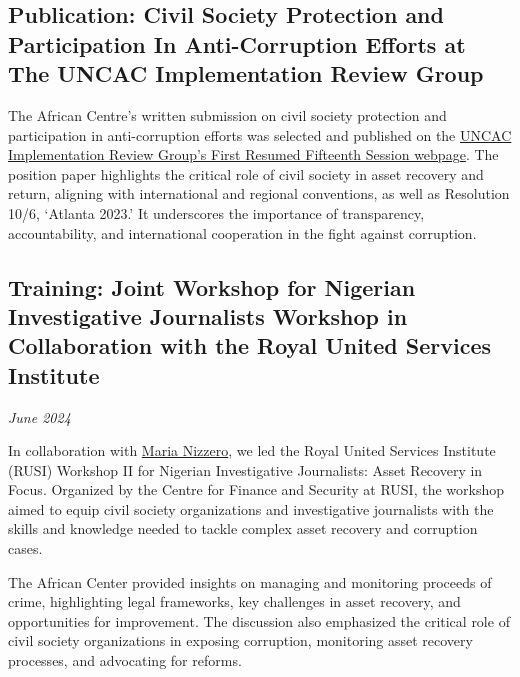 \documentclass[
  letterpaper,
  DIV=11,
  numbers=noendperiod]{scrreprt}
\begin{document}
\subsection{Publication: Civil Society Protection and Participation In
Anti-Corruption Efforts at The UNCAC Implementation Review
Group}\label{publication-civil-society-protection-and-participation-in-anti-corruption-efforts-at-the-uncac-implementation-review-group}

The African Centre's written submission on civil society protection and
participation in anti-corruption efforts was selected and published on
the
\href{https://track.unodc.org/uploads/documents/UNCAC/WorkingGroups/ImplementationReviewGroup/28Aug-6Sep2024/NGO/CAC-COSP-IRG-2024-NGO-9.pdf}{UNCAC
Implementation Review Group's First Resumed Fifteenth Session webpage}.
The position paper highlights the critical role of civil society in
asset recovery and return, aligning with international and regional
conventions, as well as Resolution 10/6, `Atlanta 2023.' It underscores
the importance of transparency, accountability, and international
cooperation in the fight against corruption.

\subsection{Training: Joint Workshop for Nigerian Investigative
Journalists Workshop in Collaboration with the Royal United Services
Institute}\label{training-joint-workshop-for-nigerian-investigative-journalists-workshop-in-collaboration-with-the-royal-united-services-institute}

\emph{June 2024}

In collaboration with
\href{https://www.linkedin.com/in/maria-nizzero/}{Maria Nizzero}, we led
the Royal United Services Institute (RUSI) Workshop II for Nigerian
Investigative Journalists: Asset Recovery in Focus. Organized by the
Centre for Finance and Security at RUSI, the workshop aimed to equip
civil society organizations and investigative journalists with the
skills and knowledge needed to tackle complex asset recovery and
corruption cases.

The African Center provided insights on managing and monitoring proceeds
of crime, highlighting legal frameworks, key challenges in asset
recovery, and opportunities for improvement. The discussion also
emphasized the critical role of civil society organizations in exposing
corruption, monitoring asset recovery processes, and advocating for
reforms.
\end{document}

